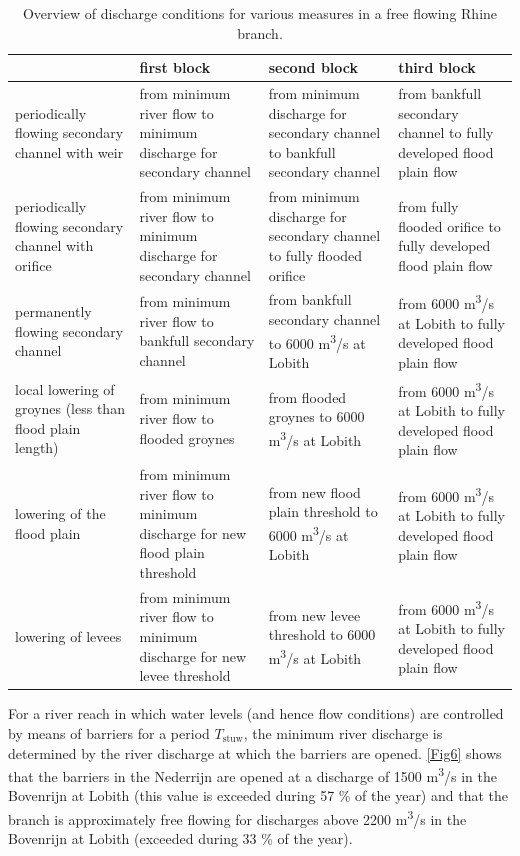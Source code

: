 \begin{table}
\small
\begin{tabular}{p{}|p{}|p{}|p{}}
 & first block & second block & third block \\ \hline
periodically flowing secondary channel with weir & from minimum river flow to minimum discharge for secondary channel & from minimum discharge for secondary channel to bankfull secondary channel & from bankfull secondary channel to fully developed flood plain flow \\ \hline
periodically flowing secondary channel with orifice & from minimum river flow to minimum discharge for secondary channel & from minimum discharge for secondary channel to fully flooded orifice & from fully flooded orifice to fully developed flood plain flow \\ \hline
permanently flowing secondary channel & from minimum river flow to bankfull secondary channel & from bankfull secondary channel to 6000 m\textsuperscript{3}/s at Lobith & from 6000 m\textsuperscript{3}/s at Lobith to fully developed flood plain flow \\ \hline
local lowering of groynes (less than flood plain length) & from minimum river flow to flooded groynes & from flooded groynes to 6000 m\textsuperscript{3}/s at Lobith & from 6000 m\textsuperscript{3}/s at Lobith to fully developed flood plain flow \\ \hline
lowering of the flood plain & from minimum river flow to minimum discharge for new flood plain threshold & from new flood plain threshold to 6000 m\textsuperscript{3}/s at Lobith & from 6000 m\textsuperscript{3}/s at Lobith to fully developed flood plain flow \\ \hline
lowering of levees & from minimum river flow to minimum discharge for new levee threshold & from new levee threshold to 6000 m\textsuperscript{3}/s at Lobith & from 6000 m\textsuperscript{3}/s at Lobith to fully developed flood plain flow \\
\end{tabular}

\caption{Overview of discharge conditions for various measures in a free flowing Rhine branch.}
\label{Tab1}
\end{table}

For a river reach in which water levels (and hence flow conditions) are controlled by means of barriers for a period $T_\text{stuw}$, the minimum river discharge is determined by the river discharge at which the barriers are opened.
\autoref{Fig6} shows that the barriers in the Nederrijn are opened at a discharge of 1500 m\textsuperscript{3}/s in the Bovenrijn at Lobith (this value is exceeded during 57 \% of the year) and that the branch is approximately free flowing for discharges above 2200 m\textsuperscript{3}/s in the Bovenrijn at Lobith (exceeded during 33 \% of the year).

